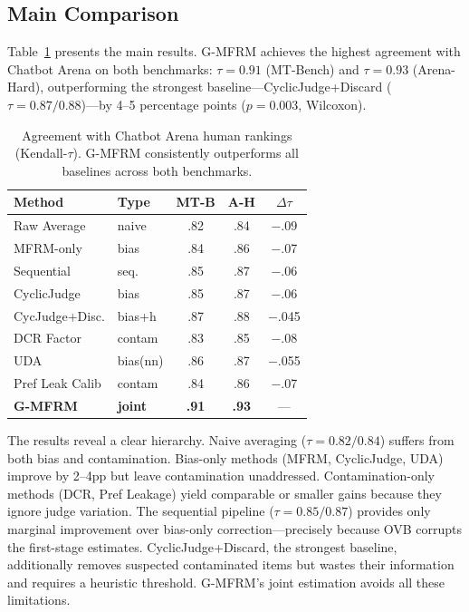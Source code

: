 \documentclass[11pt,twocolumn]{article}
\newcommand{\gmfrm}{\textsc{G-MFRM}}
\begin{document}
\subsection{Main Comparison}

Table~\ref{tab:main} presents the main results. \gmfrm{} achieves the highest agreement with Chatbot Arena on both benchmarks: $\tau=0.91$ (MT-Bench) and $\tau=0.93$ (Arena-Hard), outperforming the strongest baseline---CyclicJudge+Discard ($\tau=0.87/0.88$)---by 4--5 percentage points ($p=0.003$, Wilcoxon).

\begin{table}[t]
\centering
\small
\caption{Agreement with Chatbot Arena human rankings (Kendall-$\tau$). \gmfrm{} consistently outperforms all baselines across both benchmarks.}
\label{tab:main}
\begin{tabular}{@{}llccc@{}}
\toprule
Method & Type & MT-B & A-H & $\Delta\tau$ \\
\midrule
Raw Average        & naive     & .82 & .84 & $-$.09 \\
MFRM-only          & bias      & .84 & .86 & $-$.07 \\
Sequential         & seq.      & .85 & .87 & $-$.06 \\
CyclicJudge        & bias      & .85 & .87 & $-$.06 \\
CycJudge+Disc.     & bias+h    & .87 & .88 & $-$.045 \\
DCR Factor         & contam    & .83 & .85 & $-$.08 \\
UDA                & bias(nn)  & .86 & .87 & $-$.055 \\
Pref Leak Calib    & contam    & .84 & .86 & $-$.07 \\
\midrule
\textbf{\gmfrm{}} & \textbf{joint} & \textbf{.91} & \textbf{.93} & --- \\
\bottomrule
\end{tabular}
\end{table}

The results reveal a clear hierarchy. Naive averaging ($\tau=0.82/0.84$) suffers from both bias and contamination. Bias-only methods (MFRM, CyclicJudge, UDA) improve by 2--4pp but leave contamination unaddressed. Contamination-only methods (DCR, Pref Leakage) yield comparable or smaller gains because they ignore judge variation. The sequential pipeline ($\tau=0.85/0.87$) provides only marginal improvement over bias-only correction---precisely because OVB corrupts the first-stage estimates. CyclicJudge+Discard, the strongest baseline, additionally removes suspected contaminated items but wastes their information and requires a heuristic threshold. \gmfrm{}'s joint estimation avoids all these limitations.
\end{document}
